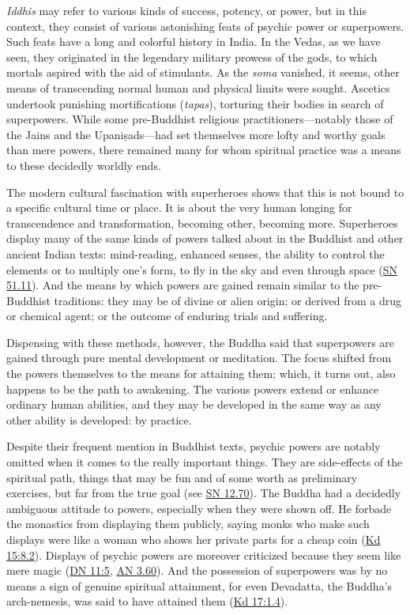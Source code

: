 \documentclass[12pt,openany]{book}%
\begin{document}
\textit{Iddhis} may refer to various kinds of success, potency, or power, but in this context, they consist of various astonishing feats of psychic power or superpowers. Such feats have a long and colorful history in India. In the Vedas, as we have seen, they originated in the legendary military prowess of the gods, to which mortals aspired with the aid of stimulants. As the \textit{soma} vanished, it seems, other means of transcending normal human and physical limits were sought. Ascetics undertook punishing mortifications (\textit{tapas}), torturing their bodies in search of superpowers. While some pre-Buddhist religious practitioners—notably those of the Jains and the \textsanskrit{Upaniṣads}—had set themselves more lofty and worthy goals than mere powers, there remained many for whom spiritual practice was a means to these decidedly worldly ends.

The modern cultural fascination with superheroes shows that this is not bound to a specific cultural time or place. It is about the very human longing for transcendence and transformation, becoming other, becoming more. Superheroes display many of the same kinds of powers talked about in the Buddhist and other ancient Indian texts: mind-reading, enhanced senses, the ability to control the elements or to multiply one’s form, to fly in the sky and even through space (\href{https://suttacentral.net/sn51.11}{SN 51.11}). And the means by which powers are gained remain similar to the pre-Buddhist traditions: they may be of divine or alien origin; or derived from a drug or chemical agent; or the outcome of enduring trials and suffering.

Dispensing with these methods, however, the Buddha said that superpowers are gained through pure mental development or meditation. The focus shifted from the powers themselves to the means for attaining them; which, it turns out, also happens to be the path to awakening. The various powers extend or enhance ordinary human abilities, and they may be developed in the same way as any other ability is developed: by practice.

Despite their frequent mention in Buddhist texts, psychic powers are notably omitted when it comes to the really important things. They are side-effects of the spiritual path, things that may be fun and of some worth as preliminary exercises, but far from the true goal (see \href{https://suttacentral.net/sn12.70}{SN 12.70}). The Buddha had a decidedly ambiguous attitude to powers, especially when they were shown off. He forbade the monastics from displaying them publicly, saying monks who make such displays were like a woman who shows her private parts for a cheap coin (\href{https://suttacentral.net/pli-tv-kd15\#8.2}{Kd 15:8.2}). Displays of psychic powers are moreover criticized because they seem like mere magic (\href{https://suttacentral.net/dn11/en/sujato\#5}{DN 11:5}, \href{https://suttacentral.net/an3.60}{AN 3.60}). And the possession of superpowers was by no means a sign of genuine spiritual attainment, for even Devadatta, the Buddha’s arch-nemesis, was said to have attained them (\href{https://suttacentral.net/pli-tv-kd17\#1.4}{Kd 17:1.4}).
\end{document}
